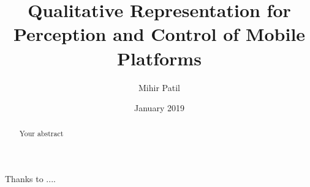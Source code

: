 \documentclass[rnd]{mas_report}
\author{Mihir Patil}
\title{Qualitative Representation for Perception and Control of Mobile Platforms}
\date{January  2019}
\begin{document}
\begin{titlepage}
    \maketitle
\end{titlepage}


\pagestyle{plain}


\cleardoublepage
\statementpage

\begin{abstract}
Your abstract
\end{abstract}


\begin{acknowledgements}
Thanks to ....
\end{acknowledgements}


\tableofcontents
\listoffigures
\listoftables


\mainmatter %

\pagestyle{mainmatter}











\begin{appendices}


\end{appendices}

\backmatter

\end{document}
